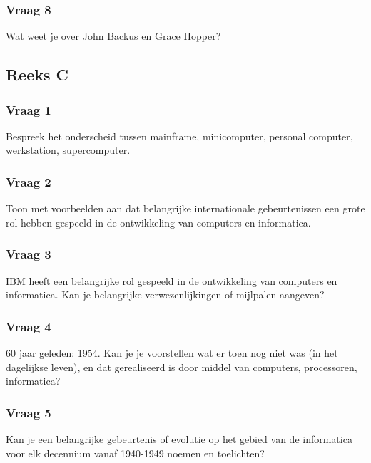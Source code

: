 \documentclass[../main.tex]{subfiles}
\begin{document}
\subsubsection{Vraag 8}
\begin{question}
Wat weet je over John Backus en Grace Hopper?
\end{question}


\subsection{Reeks C}
\subsubsection{Vraag 1}
\begin{question}
Bespreek het onderscheid tussen mainframe, minicomputer, personal computer, werkstation, supercomputer.
\end{question}

\subsubsection{Vraag 2}
\begin{question}
Toon met voorbeelden aan dat belangrijke internationale gebeurtenissen een grote rol hebben gespeeld in de ontwikkeling van computers en informatica.
\end{question}

\subsubsection{Vraag 3}
\begin{question}
IBM heeft een belangrijke rol gespeeld in de ontwikkeling van computers en informatica. Kan je belangrijke verwezenlijkingen of mijlpalen aangeven?
\end{question}

\subsubsection{Vraag 4}
\begin{question}
60 jaar geleden: 1954. Kan je je voorstellen wat er toen nog niet was (in het dagelijkse leven), en dat gerealiseerd is door middel van computers, processoren, informatica?
\end{question}

\subsubsection{Vraag 5}
\begin{question}
Kan je een belangrijke gebeurtenis of evolutie op het gebied van de informatica voor elk  decennium vanaf 1940-1949 noemen en toelichten?
\end{question}
\end{document}
